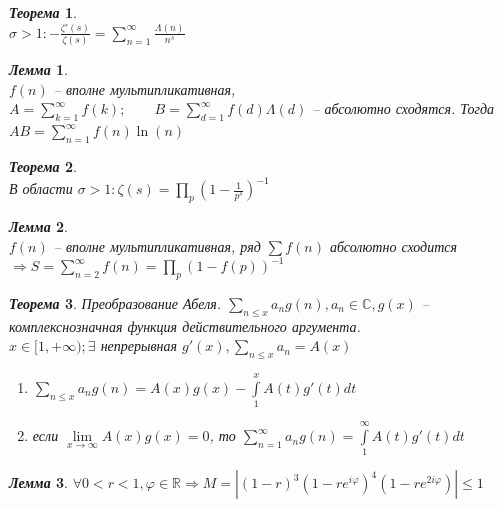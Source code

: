 \documentclass[a4paper,12pt]{article}
\newtheorem{teo2}{\textit{Теорема}}
\newtheorem{lem2}{\textit{Лемма}}
\newcommand{\q}{\quad}
\newcommand{\Ra}{\Rightarrow}
\newcommand{\bb}[1]{\mathbb{#1}}
\newcommand{\SL}{\sum\limits}
\newcommand{\IL}{\int\limits}
\begin{document}
\begin{formbox}{}
\begin{teo2}\q\\
$\sigma > 1: -\frac{\zeta'(s)}{\zeta(s)} = \SL_{n=1}^\infty \frac{\Lambda(n)}{n^s} $
\end{teo2}
\end{formbox}
\begin{formbox}{}
\begin{lem2}\q\\
$f(n)$ -- вполне мультипликативная, $A = \SL_{k=1}^\infty f(k);\q\q B = \SL_{d=1}^\infty f(d)\Lambda(d)$ -- абсолютно сходятся. Тогда $AB = \SL_{n=1}^\infty f(n) \ln(n)$
\end{lem2}
\end{formbox}
\begin{formbox}{}
\begin{teo2}\q\\
В области $\sigma > 1: \zeta(s) = \prod\limits_p (1 - \frac{1}{p^s})^{-1}$
\end{teo2}
\end{formbox}
\begin{formbox}{}
\begin{lem2}\q\\
$f(n)$ -- вполне мультипликативная, ряд $\sum f(n)$ абсолютно сходится $\Ra S = \SL_{n=2}^\infty f(n) = \prod\limits_p (1-f(p))^{-1}  $
\end{lem2}
\end{formbox}
\begin{formbox}{}
\begin{teo2}
Преобразование Абеля. $\SL_{n\le x} a_n g(n), a_n\in \bb{C}, g(x)$ -- комплекснозначная функция действительного аргумента.\\
$x\in[1,+\infty); \exists$ непрерывная $g'(x), \SL_{n \le x}a_n = A(x)$\\
\begin{enumerate}
    \item $\SL_{n\le x}a_ng(n) = A(x)g(x) - \IL_1^x A(t)g'(t)dt $
    \item если $\lim\limits_{x\to\infty} A(x)g(x) = 0$, то $\SL_{n=1}^\infty a_ng(n) = \IL_1^\infty A(t)g'(t)dt $
\end{enumerate}
\end{teo2}
\end{formbox}
\begin{formbox}{}
\begin{lem2} $\forall 0 < r < 1, \varphi\in \bb{R} \Ra M = \left| (1-r)^3(1-re^{i\varphi})^4 (1 - re^{2i\varphi}) \right| \le 1 $
\end{lem2}
\end{formbox}
\end{document}
